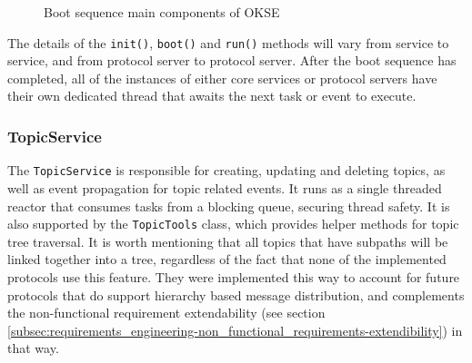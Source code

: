 \begin{center}
  \begin{figure}[ht!]
    \caption{Boot sequence main components of OKSE}
    \label{fig:boot-sequence}
  \end{figure}
\end{center}

The details of the \verb!init()!, \verb!boot()! and \verb!run()! methods will vary from service to service, and from protocol server to protocol server. After the boot sequence has completed, all of the instances of either core services or protocol servers have their own dedicated thread that awaits the next task or event to execute.

\subsubsection{TopicService}
\label{subsec:architecture_and_implementation-implementation-core-topicservice}

The \verb!TopicService! is responsible for creating, updating and  deleting topics, as well as event propagation for topic related events. It runs as a single threaded reactor that consumes tasks from a blocking queue, securing thread safety. It is also supported by the \verb!TopicTools! class, which provides helper methods for topic tree traversal. It is worth mentioning that all topics that have subpaths will be linked together into a tree, regardless of the fact that none of the implemented protocols use this feature. They were implemented this way to account for future protocols that do support hierarchy based message distribution, and complements the non-functional requirement extendability  (see section \ref{subsec:requirements_engineering-non_functional_requirements-extendibility}) in that way.

